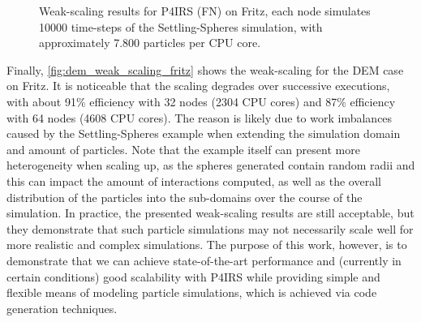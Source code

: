 \documentclass[Afour,sageh,times]{sagej}
\begin{document}
\begin{figure}[t]
\centering
{}
\vspace{-2ex}
\caption{Weak-scaling results for P4IRS (FN) on Fritz, each node simulates 10000 time-steps of the Settling-Spheres simulation, with approximately 7.800 particles per CPU core.}
\vspace{-2ex}
\label{fig:dem_weak_scaling_fritz}
\end{figure}

Finally, \autoref{fig:dem_weak_scaling_fritz} shows the weak-scaling for the DEM case on Fritz.
It is noticeable that the scaling degrades over successive executions, with about 91\% efficiency with 32 nodes (2304 CPU cores) and 87\% efficiency with 64 nodes (4608 CPU cores).
The reason is likely due to work imbalances caused by the Settling-Spheres example when extending the simulation domain and amount of particles.
Note that the example itself can present more heterogeneity when scaling up, as the spheres generated contain random radii and this can impact the amount of interactions computed, as well as the overall distribution of the particles into the sub-domains over the course of the simulation.
In practice, the presented weak-scaling results are still acceptable, but they demonstrate that such particle simulations may not necessarily scale well for more realistic and complex simulations.
The purpose of this work, however, is to demonstrate that we can achieve state-of-the-art performance and (currently in certain conditions) good scalability with P4IRS while providing simple and flexible means of modeling particle simulations, which is achieved via code generation techniques.
\end{document}
